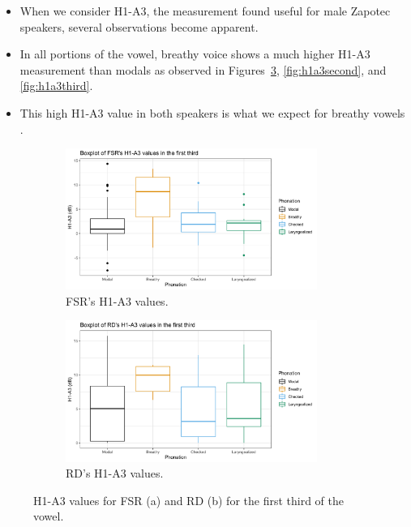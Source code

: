 \documentclass[12pt, letterpaper]{article}
\begin{document}
\begin{itemize}
	\item When we consider H1-A3, the measurement \citet{espositoVariationContrastivePhonation2010} found useful for male Zapotec speakers, several observations become apparent. 
	\item In all portions of the vowel, breathy voice shows a much higher H1-A3 measurement than modals as observed in Figures~\ref{fig:h1a3first}, \ref{fig:h1a3second}, and \ref{fig:h1a3third}.
	\item This high H1-A3 value in both speakers is what we expect for breathy vowels \citep{fischer-jorgensenPhoneticAnalysisBreathy1968}. 
\end{itemize}
\begin{figure}[!h]
	\centering
	\begin{subfigure}{.5\textwidth}
		\centering
		\includegraphics[width=0.9\textwidth]{../mean_FSR_h1a3_First.png}
		\caption{FSR's H1-A3 values.}
		\label{fig:FSRh1a3first} 
	\end{subfigure}%
	\begin{subfigure}{.5\textwidth}
		\centering
		\includegraphics[width=0.9\textwidth]{../mean_RD_h1a3_First.png}
		\caption{RD's H1-A3 values.}
		\label{fig:RDh1a3first} 
	\end{subfigure}
	\caption{H1-A3 values for FSR (a) and RD (b) for the first third of the vowel. }
	\label{fig:h1a3first}
\end{figure}
\end{document}
